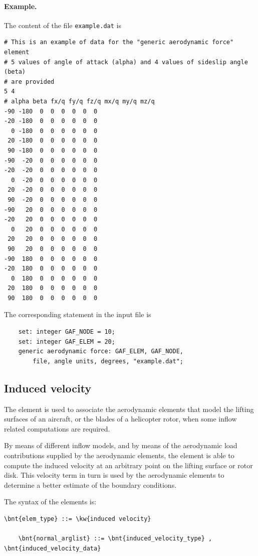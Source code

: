 \paragraph{Example.}
The content of the file \texttt{example.dat} is
\begin{verbatim}
# This is an example of data for the "generic aerodynamic force" element
# 5 values of angle of attack (alpha) and 4 values of sideslip angle (beta)
# are provided
5 4
# alpha beta fx/q fy/q fz/q mx/q my/q mz/q
-90 -180  0  0  0  0  0  0
-20 -180  0  0  0  0  0  0
  0 -180  0  0  0  0  0  0
 20 -180  0  0  0  0  0  0
 90 -180  0  0  0  0  0  0
-90  -20  0  0  0  0  0  0
-20  -20  0  0  0  0  0  0
  0  -20  0  0  0  0  0  0
 20  -20  0  0  0  0  0  0
 90  -20  0  0  0  0  0  0
-90   20  0  0  0  0  0  0
-20   20  0  0  0  0  0  0
  0   20  0  0  0  0  0  0
 20   20  0  0  0  0  0  0
 90   20  0  0  0  0  0  0
-90  180  0  0  0  0  0  0
-20  180  0  0  0  0  0  0
  0  180  0  0  0  0  0  0
 20  180  0  0  0  0  0  0
 90  180  0  0  0  0  0  0
\end{verbatim}
The corresponding statement in the input file is
\begin{verbatim}
    set: integer GAF_NODE = 10;
    set: integer GAF_ELEM = 20;
    generic aerodynamic force: GAF_ELEM, GAF_NODE,
        file, angle units, degrees, "example.dat";
\end{verbatim}



\subsection{Induced velocity}
\label{sec:EL:AERO:INDVEL}
The  element is used to associate the aerodynamic elements
that model the lifting surfaces of an aircraft,
or the blades of a helicopter rotor, when some inflow related computations 
are required.

By means of different inflow models, and by means
of the aerodynamic load contributions supplied by the aerodynamic elements,
the  element is able to compute the induced velocity
at an arbitrary point on the lifting surface or rotor disk.
This velocity term in turn is used by the aerodynamic elements to determine
a better estimate of the boundary conditions.

The syntax of the  elements is:
\begin{Verbatim}[commandchars=\\\{\}]
    \bnt{elem_type} ::= \kw{induced velocity}

    \bnt{normal_arglist} ::= \bnt{induced_velocity_type} , \bnt{induced_velocity_data}
\end{Verbatim}

